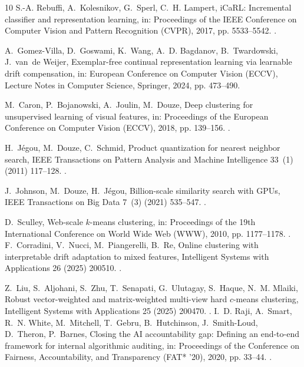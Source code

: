 \documentclass[5p,times,twocolumn]{elsarticle}
\begin{document}
\begin{thebibliography}{10}
S.-A. Rebuffi, A.~Kolesnikov, G.~Sperl, C.~H. Lampert, {iCaRL}: Incremental classifier and representation learning, in: Proceedings of the IEEE Conference on Computer Vision and Pattern Recognition (CVPR), 2017, pp. 5533--5542. \newblock \href {https://doi.org/10.1109/CVPR.2017.587} {}.

A.~Gomez-Villa, D.~Goswami, K.~Wang, A.~D. Bagdanov, B.~Twardowski, J.~van~de Weijer, Exemplar-free continual representation learning via learnable drift compensation, in: European Conference on Computer Vision (ECCV), Lecture Notes in Computer Science, Springer, 2024, pp. 473--490.

M.~Caron, P.~Bojanowski, A.~Joulin, M.~Douze, Deep clustering for unsupervised learning of visual features, in: Proceedings of the European Conference on Computer Vision (ECCV), 2018, pp. 139--156. \newblock \href {https://doi.org/10.1007/978-3-030-01264-9_9} {}.

H.~J{\'e}gou, M.~Douze, C.~Schmid, Product quantization for nearest neighbor
  search, IEEE Transactions on Pattern Analysis and Machine Intelligence 33~(1)
  (2011) 117--128.
\newblock \href {https://doi.org/10.1109/TPAMI.2010.57}
  {}.

J.~Johnson, M.~Douze, H.~J{\'e}gou, Billion-scale similarity search with
  {GPUs}, IEEE Transactions on Big Data 7~(3) (2021) 535--547.
\newblock \href {https://doi.org/10.1109/TBDATA.2019.2921572}
  {}.

D.~Sculley, Web-scale $k$-means clustering, in: Proceedings of the 19th
  International Conference on World Wide Web (WWW), 2010, pp. 1177--1178.
\newblock \href {https://doi.org/10.1145/1772690.1772862}
  {}.
F.~Corradini, V.~Nucci, M.~Piangerelli, B.~Re, Online clustering with interpretable drift adaptation to mixed features, Intelligent Systems with Applications 26 (2025) 200510. \newblock \href {https://doi.org/10.1016/j.iswa.2025.200510} {}.

Z.~Liu, S.~Aljohani, S.~Zhu, T.~Senapati, G.~Ulutagay, S.~Haque, N.~M. Mlaiki, Robust vector-weighted and matrix-weighted multi-view hard $c$-means clustering, Intelligent Systems with Applications 25 (2025) 200470. \newblock \href {https://doi.org/10.1016/j.iswa.2024.200470} {}.
I.~D. Raji, A.~Smart, R.~N. White, M.~Mitchell, T.~Gebru, B.~Hutchinson,
  J.~Smith-Loud, D.~Theron, P.~Barnes, Closing the {AI} accountability gap:
  Defining an end-to-end framework for internal algorithmic auditing, in:
  Proceedings of the Conference on Fairness, Accountability, and Transparency
  (FAT* '20), 2020, pp. 33--44.
\newblock \href {https://doi.org/10.1145/3351095.3372873}
  {}.


\end{thebibliography}
\end{document}
